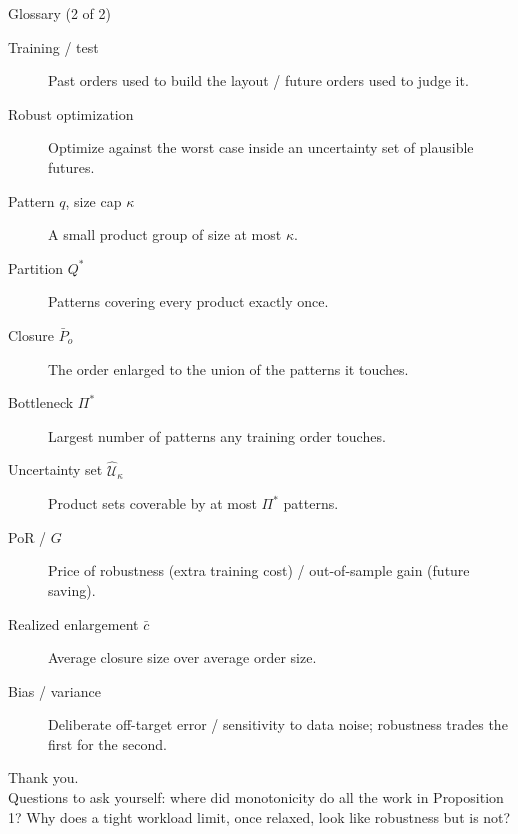 \documentclass[11pt,aspectratio=169]{beamer}
\begin{document}
\begin{frame}{Glossary (2 of 2)}
  \footnotesize
  \begin{description}
    \item[Training / test] Past orders used to build the layout / future orders used to judge it.
    \item[Robust optimization] Optimize against the worst case inside an uncertainty set of plausible futures.
    \item[Pattern $q$, size cap $\kappa$] A small product group of size at most $\kappa$.
    \item[Partition $Q^*$] Patterns covering every product exactly once.
    \item[Closure $\bar P_o$] The order enlarged to the union of the patterns it touches.
    \item[Bottleneck $\Pi^*$] Largest number of patterns any training order touches.
    \item[Uncertainty set $\widehat{\mathcal U}_\kappa$] Product sets coverable by at most $\Pi^*$ patterns.
    \item[PoR / $G$] Price of robustness (extra training cost) / out-of-sample gain (future saving).
    \item[Realized enlargement $\bar c$] Average closure size over average order size.
    \item[Bias / variance] Deliberate off-target error / sensitivity to data noise; robustness trades the first for the second.
  \end{description}
\end{frame}

\begin{frame}[plain]
  \centering
  \vfill
  {\Large Thank you.}\\[2mm]
  {\normalsize Questions to ask yourself: where did monotonicity do all the work in Proposition 1? Why does a tight workload limit, once relaxed, look like robustness but is not?}
  \vfill
\end{frame}
\end{document}
